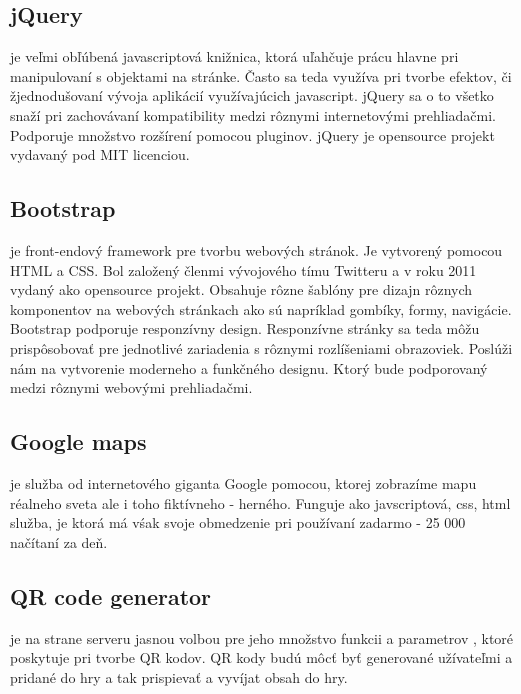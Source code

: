 \subsection{jQuery} je veľmi obľúbená\cite{jquery-usage} javascriptová knižnica, ktorá uľahčuje prácu hlavne pri manipulovaní s objektami na stránke. Často sa teda využíva pri tvorbe efektov, či žjednodušovaní vývoja aplikácií využívajúcich javascript. jQuery sa o to všetko snaží pri zachovávaní kompatibility medzi rôznymi internetovými prehliadačmi\cite{jquery-browsers}. Podporuje množstvo rozšírení pomocou pluginov\cite{jquery-plugins}. jQuery je opensource projekt vydavaný pod MIT licenciou. 

\subsection{Bootstrap} je front-endový framework pre tvorbu webových stránok. Je vytvorený pomocou HTML a CSS. Bol založený členmi vývojového tímu Twitteru a v roku 2011 vydaný ako opensource projekt\cite{bootstrap-about}. Obsahuje rôzne šablóny pre dizajn rôznych komponentov na webových stránkach ako sú napríklad gombíky, formy, navigácie. Bootstrap podporuje responzívny design. Responzívne stránky sa teda môžu prispôsobovať pre jednotlivé zariadenia s rôznymi rozlíšeniami obrazoviek. Poslúži nám na vytvorenie moderneho a funkčného designu. Ktorý bude podporovaný medzi rôznymi webovými prehliadačmi.


\subsection{Google maps} je služba od internetového giganta Google pomocou, ktorej zobrazíme mapu réalneho sveta ale i toho fiktívneho - herného. Funguje ako javscriptová, css, html služba, je ktorá má vśak svoje obmedzenie pri používaní zadarmo - 25 000 načítaní za deň\cite{gmaps-usage}.



\subsection{QR code generator} je na strane serveru jasnou volbou pre jeho množstvo funkcii a parametrov \cite{qrgenerator-functions}, ktoré poskytuje pri tvorbe QR kodov. QR kody budú môcť byť generované užívateľmi a pridané do hry a tak prispievať a vyvíjat obsah do hry.



